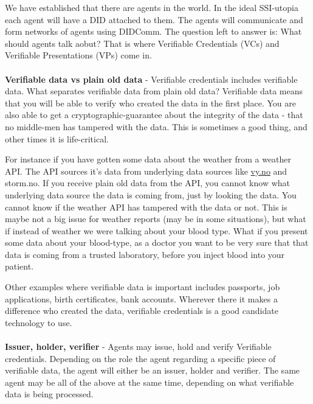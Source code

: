 We have established that there are agents in the world. In the ideal
SSI-utopia each agent will have a DID attached to them. The agents will
communicate and form networks of agents using DIDComm. The question left
to answer is: What should agents talk aobut? That is where Verifiable
Credentials (VCs) and Verifiable Presentations (VPs) come in.

\paragraph{}

\textbf{Verifiable data vs plain old data} - Verifiable credentials
includes verifiable data. What separates verifiable data from plain old
data? Verifiable data means that you will be able to verify who created
the data in the first place. You are also able to get a
cryptographic-guarantee about the integrity of the data - that no
middle-men has tampered with the data. This is sometimes a good thing,
and other times it is life-critical.

For instance if you have gotten some data about the weather from a
weather API. The API sources it's data from underlying data sources like
\href{http://vy.no}{vy.no} and storm.no. If you receive plain old data
from the API, you cannot know what underlying data source the data is
coming from, just by looking the data. You cannot know if the weather
API has tampered with the data or not. This is maybe not a big issue for
weather reports (may be in some situations), but what if instead of
weather we were talking about your blood type. What if you present some
data about your blood-type, as a doctor you want to be very sure that
that data is coming from a trusted laboratory, before you inject blood
into your patient.

Other examples where verifiable data is important includes passports,
job applications, birth certificates, bank accounts. Wherever there it
makes a difference who created the data, verifiable credentials is a
good candidate technology to use.

\paragraph{}

\textbf{Issuer, holder, verifier} - Agents may issue, hold and verify Verifiable credentials. Depending on
the role the agent regarding a specific piece of verifiable data, the
agent will either be an issuer, holder and verifier. The same agent may
be all of the above at the same time, depending on what verifiable data
is being processed.


